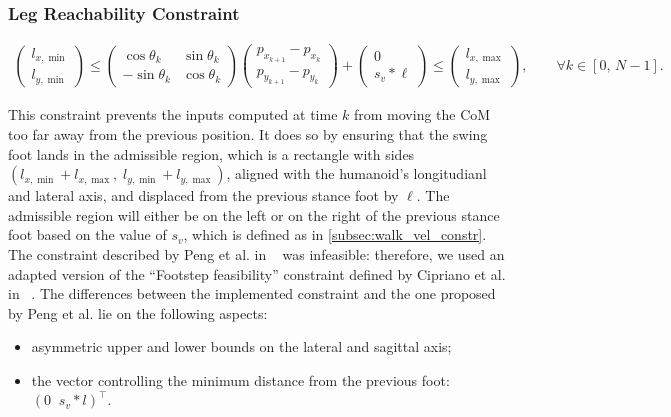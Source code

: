 \subsubsection{Leg Reachability Constraint}
\begin{small}
\begin{align}
    \begin{pmatrix}
        l_{x,\min} \\[1ex]
        l_{y,\min}
    \end{pmatrix}
    \le
    \begin{pmatrix}
        \cos\theta_{k} & \sin\theta_{k} \\[1ex]
        -\sin\theta_{k} & \cos\theta_{k}
    \end{pmatrix}
    \begin{pmatrix}
        p_{x_{k+1}} - p_{x_{k}} \\[1ex]
        p_{y_{k+1}} - p_{y_{k}}
    \end{pmatrix}
    +
    \begin{pmatrix}
        0 \\[1ex]
        s_v * \ell
    \end{pmatrix}
    \le
    \begin{pmatrix}
        l_{x,\max} \\[1ex]
        l_{y,\max}
    \end{pmatrix}
    , \qquad \forall k \in \left[ 0,\, N-1\right].
\end{align}
\end{small}

This constraint prevents the inputs computed at time $k$ from moving the CoM too far away from the previous position.
It does so by ensuring that the swing foot lands in the admissible region, which is a rectangle with sides $(l_{x,\min} + l_{x,\max}, \; l_{y,\min} + l_{y,\max})$, aligned with the humanoid's longitudianl and lateral axis, and displaced from the previous stance foot by $\ell$. The admissible region will either be on the left or on the right of the previous stance foot based on the value of $s_v$, which is defined as in \ref{subsec:walk_vel_constr}.
The constraint described by Peng et al. in ~\cite{peng_main_paper} was infeasible: therefore, we used an adapted version of the ``Footstep feasibility'' constraint defined by Cipriano et al. in ~\cite{CIPRIANO2023104495}.
The differences between the implemented constraint and the one proposed by Peng et al. lie on the following aspects:
\begin{itemize}
    \item asymmetric upper and lower bounds on the lateral and sagittal axis;
    \item the vector controlling the minimum distance from the previous foot: $(0\;\; s_v * l)^\top$.
\end{itemize}



